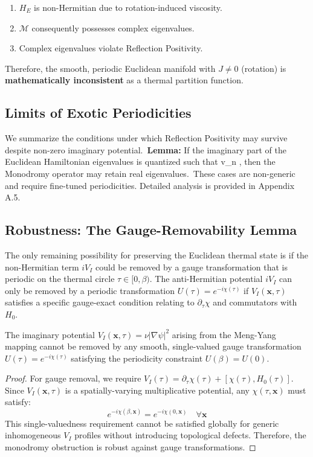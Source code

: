\documentclass[11pt]{article}
\begin{document}
\begin{enumerate}
    \item $H_E$ is non-Hermitian due to rotation-induced viscosity.
    \item $\mathcal{M}$ consequently possesses complex eigenvalues.
    \item Complex eigenvalues violate Reflection Positivity\cite{OsterwalderSchrader1973}.
\end{enumerate}
Therefore, the smooth, periodic Euclidean manifold with $J \neq 0$ (rotation) is \textbf{mathematically inconsistent} as a thermal partition function.

\subsection{Limits of Exotic Periodicities}\label{sec:exotic_periodicities}
We summarize the conditions under which Reflection Positivity may survive despite non-zero imaginary potential.\
\textbf{Lemma:} If the imaginary part of the Euclidean Hamiltonian eigenvalues is quantized such that \beta v_n \pi{}, then the Monodromy operator may retain real eigenvalues.\
These cases are non-generic and require fine-tuned periodicities. Detailed analysis is provided in Appendix A.5.\
\subsection{Robustness: The Gauge-Removability Lemma}

The only remaining possibility for preserving the Euclidean thermal state is if the non-Hermitian term $iV_I$ could be removed by a gauge transformation that is periodic on the thermal circle $\tau \in [0, \beta)$.
The anti-Hermitian potential $iV_I$ can only be removed by a periodic transformation $U(\tau)=e^{-i\chi(\tau)}$ if $V_I(\mathbf{x}, \tau)$ satisfies a specific gauge-exact condition relating to $\partial_\tau\chi$ and commutators with $H_0$.

\begin{lemma}[Non-removability of Viscous Dissipation]
The imaginary potential $V_I(\mathbf{x},\tau) = \nu|\nabla\psi|^2$ arising from the Meng-Yang mapping 
cannot be removed by any smooth, single-valued gauge transformation $U(\tau) = e^{-i\chi(\tau)}$ 
satisfying the periodicity constraint $U(\beta) = U(0)$.
\end{lemma}

\begin{proof}
For gauge removal, we require $V_I(\tau) = \partial_\tau\chi(\tau) + [\chi(\tau), H_0(\tau)]$.
Since $V_I(\mathbf{x},\tau)$ is a spatially-varying multiplicative potential, any $\chi(\tau,\mathbf{x})$ 
must satisfy:
\begin{equation}
e^{-i\chi(\beta,\mathbf{x})} = e^{-i\chi(0,\mathbf{x})} \quad \forall \mathbf{x}
\end{equation}
This single-valuedness requirement cannot be satisfied globally for generic inhomogeneous 
$V_I$ profiles without introducing topological defects. Therefore, the monodromy obstruction 
is robust against gauge transformations.
\end{proof}
\end{document}

